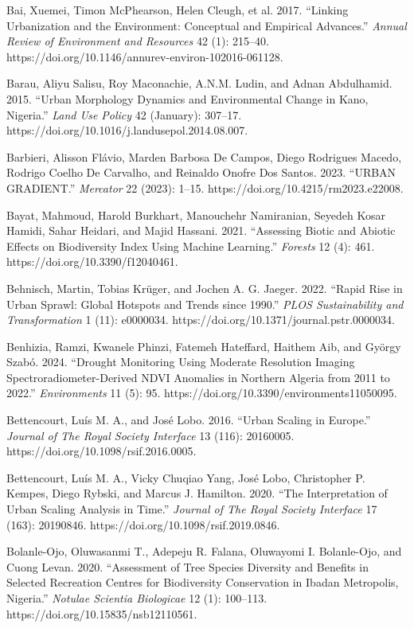Bai, Xuemei, Timon McPhearson, Helen Cleugh, et al. 2017. ``Linking Urbanization and the Environment: Conceptual and Empirical Advances.'' \emph{Annual Review of Environment and Resources} 42 (1): 215--40. https://doi.org/10.1146/annurev-environ-102016-061128.

Barau, Aliyu Salisu, Roy Maconachie, A.N.M. Ludin, and Adnan Abdulhamid. 2015. ``Urban Morphology Dynamics and Environmental Change in Kano, Nigeria.'' \emph{Land Use Policy} 42 (January): 307--17. https://doi.org/10.1016/j.landusepol.2014.08.007.

Barbieri, Alisson Flávio, Marden Barbosa De Campos, Diego Rodrigues Macedo, Rodrigo Coelho De Carvalho, and Reinaldo Onofre Dos Santos. 2023. ``URBAN GRADIENT.'' \emph{Mercator} 22 (2023): 1--15. https://doi.org/10.4215/rm2023.e22008.

Bayat, Mahmoud, Harold Burkhart, Manouchehr Namiranian, Seyedeh Kosar Hamidi, Sahar Heidari, and Majid Hassani. 2021. ``Assessing Biotic and Abiotic Effects on Biodiversity Index Using Machine Learning.'' \emph{Forests} 12 (4): 461. https://doi.org/10.3390/f12040461.

Behnisch, Martin, Tobias Krüger, and Jochen A. G. Jaeger. 2022. ``Rapid Rise in Urban Sprawl: Global Hotspots and Trends since 1990.'' \emph{PLOS Sustainability and Transformation} 1 (11): e0000034. https://doi.org/10.1371/journal.pstr.0000034.

Benhizia, Ramzi, Kwanele Phinzi, Fatemeh Hateffard, Haithem Aib, and György Szabó. 2024. ``Drought Monitoring Using Moderate Resolution Imaging Spectroradiometer-Derived NDVI Anomalies in Northern Algeria from 2011 to 2022.'' \emph{Environments} 11 (5): 95. https://doi.org/10.3390/environments11050095.

Bettencourt, Luís M. A., and José Lobo. 2016. ``Urban Scaling in Europe.'' \emph{Journal of The Royal Society Interface} 13 (116): 20160005. https://doi.org/10.1098/rsif.2016.0005.

Bettencourt, Luís M. A., Vicky Chuqiao Yang, José Lobo, Christopher P. Kempes, Diego Rybski, and Marcus J. Hamilton. 2020. ``The Interpretation of Urban Scaling Analysis in Time.'' \emph{Journal of The Royal Society Interface} 17 (163): 20190846. https://doi.org/10.1098/rsif.2019.0846.

Bolanle-Ojo, Oluwasanmi T., Adepeju R. Falana, Oluwayomi I. Bolanle-Ojo, and Cuong Levan. 2020. ``Assessment of Tree Species Diversity and Benefits in Selected Recreation Centres for Biodiversity Conservation in Ibadan Metropolis, Nigeria.'' \emph{Notulae Scientia Biologicae} 12 (1): 100--113. https://doi.org/10.15835/nsb12110561.

